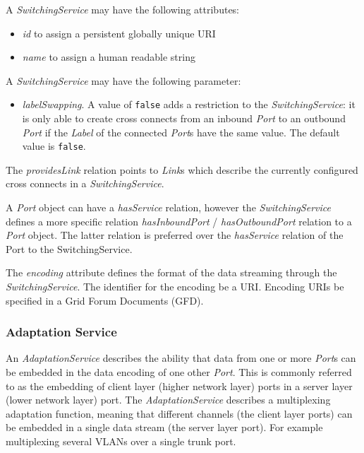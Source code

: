 A \emph{SwitchingService} may have the following attributes:
\begin{itemize}
    \item \emph{id} to assign a persistent globally unique URI
    \item \emph{name} to assign a human readable string
\end{itemize}

A \emph{SwitchingService} may have the following parameter:
\begin{itemize}
    \item \emph{labelSwapping}. A value of \texttt{false} adds a restriction to the \emph{SwitchingService}: it is only able to create cross connects from an inbound \emph{Port} to an outbound \emph{Port} if the \emph{Label} of the connected \emph{Port}s have the same value. The default value is \texttt{false}.
\end{itemize}

The \emph{providesLink} relation points to \emph{Link}s which describe the currently configured cross connects in a \emph{SwitchingService}.

A \emph{Port} object can have a \emph{hasService} relation, however the \emph{SwitchingService} defines a more specific relation \emph{hasInboundPort} / \emph{hasOutboundPort} relation to a \emph{Port} object. The latter relation is preferred over the \emph{hasService} relation of the Port to the SwitchingService.

The \emph{encoding} attribute defines the format of the data streaming through the \emph{SwitchingService}. The identifier for the encoding \MUST{} be a URI. Encoding URIs \SHOULD{} be specified in a Grid Forum Documents (GFD).


\subsubsection{Adaptation Service}%
\label{class:adaptation_service}

An \emph{AdaptationService} describes the ability that data from one or more \emph{Port}s can be embedded in the data encoding of one other \emph{Port}. This is commonly referred to as the embedding of client layer (higher network layer) ports in a server layer (lower network layer) port. The \emph{AdaptationService} describes a multiplexing adaptation function, meaning that different channels (the client layer ports) can be embedded in a single data stream (the server layer port). For example multiplexing several VLANs over a single trunk port.

